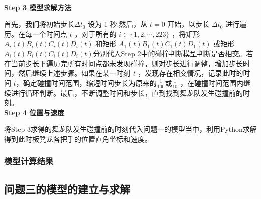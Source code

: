 \documentclass{cumcmthesis}
\begin{document}
 \\\noindent\textbf{Step 3 模型求解方法}
\par 首先，我们将初始步长$\varDelta t_0$ 设为 1 秒.然后，从 \(t = 0\) 开始，以步长 $\varDelta t_0$ 进行遍历。在每一个时间点 \(t\) ，对于所有的 \(i \in \{1, 2, \cdots, 223\}\) ，将矩形 \(A_{i}(t)B_{i}(t)C_{i}(t)D_{i}(t)\) 和矩形 \(A_{1}(t)B_{1}(t)C_{1}(t)D_{1}(t)\) 或矩形 \(A_{i}(t)B_{i}(t)C_{i}(t)D_{i}(t)\)分别代入Step 2中的碰撞判断模型判断是否相交。若在当前步长下遍历完所有时间点都未发现碰撞，则对步长进行调整，增加步长时间，然后继续上述步骤。如果在某一时刻 \(t\) ，发现存在相交情况，记录此时的时间 \(t\)，确定碰撞时间范围，缩短时间步长为原来的\(\frac{1}{100}\)或\(\frac{1}{10}\) ，在碰撞时间范围内继续进行循环判断。最后，不断调整时间和步长，直到找到舞龙队发生碰撞前的时刻。
 \\\noindent\textbf{Step 4 位置与速度}
\par 将Step 3求得的舞龙队发生碰撞前的时刻代入问题一的模型当中，利用Python求解得到此时板凳龙各把手的位置直角坐标和速度。
\subsubsection{模型计算结果}
\subsection{问题三的模型的建立与求解}
\end{document}
